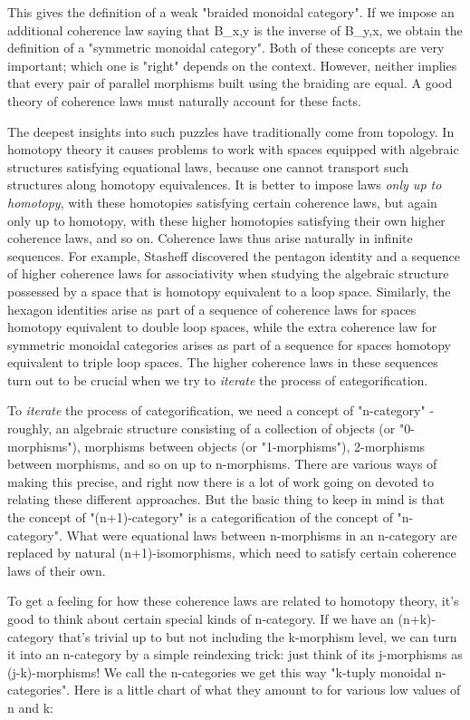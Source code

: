 This gives the definition of a weak "braided monoidal category".  
If we impose an additional coherence law saying that B_{x,y} is the
inverse of B_{y,x}, we obtain the definition of a 
"symmetric monoidal category".  
Both of these concepts are very important; which one is
"right" depends on the context.  However, neither implies that every
pair of parallel morphisms built using the braiding are equal.  A good
theory of coherence laws must naturally account for these facts.

The deepest insights into such puzzles have traditionally come from
topology.  In homotopy theory it causes problems to work with spaces
equipped with algebraic structures satisfying equational laws, because
one cannot transport such structures along homotopy equivalences.  It
is better to impose laws \emph{only up to homotopy}, with these homotopies
satisfying certain coherence laws, but again only up to homotopy, with
these higher homotopies satisfying their own higher coherence laws,
and so on.  Coherence laws thus arise naturally in infinite sequences.
For example, Stasheff discovered the pentagon identity and a sequence
of higher coherence laws for associativity when studying the algebraic
structure possessed by a space that is homotopy equivalent to a loop
space.  Similarly, the hexagon identities arise as part of a sequence
of coherence laws for spaces homotopy equivalent to double loop
spaces, while the extra coherence law for symmetric monoidal
categories arises as part of a sequence for spaces homotopy equivalent
to triple loop spaces.  The higher coherence laws in these sequences
turn out to be crucial when we try to \emph{iterate} the process of
categorification.

To \emph{iterate} the process of categorification, we need a concept of
"n-category" - roughly, an algebraic structure consisting of a
collection of objects (or "0-morphisms"), morphisms between objects
(or "1-morphisms"), 2-morphisms between morphisms, and so on up to
n-morphisms.  There are various ways of making this precise, and right
now there is a lot of work going on devoted to relating these
different approaches.  But the basic thing to keep in mind is that
the concept of "(n+1)-category" is a categorification of the concept
of "n-category".  
What were equational laws between n-morphisms in
an n-category are replaced by natural (n+1)-isomorphisms, which need
to satisfy certain coherence laws of their own.

To get a feeling for how these coherence laws are related to homotopy
theory, it's good to think about certain special kinds of n-category.
If we have an (n+k)-category that's trivial up to but not including
the k-morphism level, we can turn it into an n-category by a simple
reindexing trick: just think of its j-morphisms as (j-k)-morphisms!
We call the n-categories we get this way "k-tuply monoidal 
n-categories".  Here is a little chart of what they amount to for
various low values of n and k:


